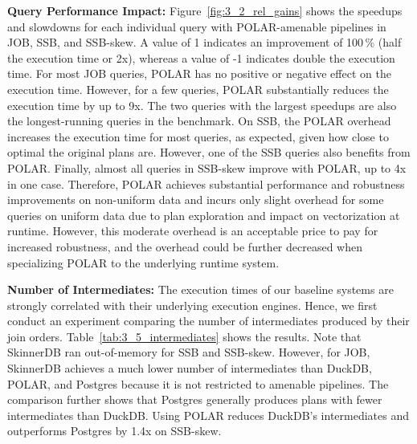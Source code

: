 \textbf{Query Performance Impact:} Figure~\ref{fig:3_2_rel_gains} shows the speedups and slowdowns for each individual query with POLAR-amenable pipelines in JOB, SSB, and SSB-skew. A value of 1 indicates an improvement of 100\,\% (\ie half the execution time or 2x), whereas a value of -1 indicates double the execution time. For most JOB queries, POLAR has no positive or negative effect on the execution time. However, for a few queries, POLAR substantially reduces the execution time by up to 9x. The two queries with the largest speedups are also the longest-running queries in the benchmark. On SSB, the POLAR overhead increases the execution time for most queries, as expected, given how close to optimal the original plans are. However, one of the SSB queries also benefits from POLAR. Finally, almost all queries in SSB-skew improve with POLAR, up to 4x in one case. Therefore, POLAR achieves substantial performance and robustness improvements on non-uniform data and incurs only slight overhead for some queries on uniform data due to plan exploration and impact on vectorization at runtime. However, this moderate overhead is an acceptable price to pay for increased robustness, and the overhead could be further decreased when specializing POLAR to the underlying runtime system.

\textbf{Number of Intermediates:} The execution times of our baseline systems are strongly correlated with their underlying execution engines. Hence, we first conduct an experiment comparing the number of intermediates produced by their join orders. Table~\ref{tab:3_5_intermediates} shows the results. Note that SkinnerDB ran out-of-memory for SSB and SSB-skew. However, for JOB, SkinnerDB achieves a much lower number of intermediates than DuckDB, POLAR, and Postgres because it is not restricted to amenable pipelines. The comparison further shows that Postgres generally produces plans with fewer intermediates than DuckDB. Using POLAR reduces DuckDB's intermediates and outperforms Postgres by 1.4x on SSB-skew.



